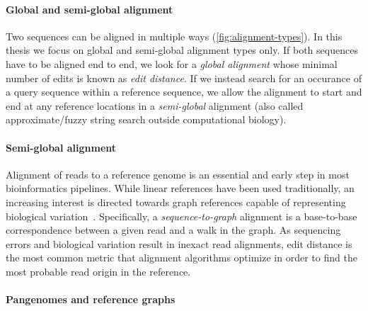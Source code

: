 \paragraph{Global and semi-global alignment}
Two sequences can be aligned in multiple ways (\cref{fig:alignment-types}). In
this thesis we focus on global and semi-global alignment types only. If both
sequences have to be aligned end to end, we look for a \emph{global alignment}
whose minimal number of edits is known as \emph{edit distance}. If we instead
search for an occurance of a query sequence within a reference sequence, we
allow the alignment to start and end at any reference locations in a
\emph{semi-global} alignment (also called approximate/fuzzy string search
outside computational biology).


\paragraph{Semi-global alignment}

Alignment of reads to a reference genome is an essential and early step in most
bioinformatics pipelines. While linear references have been used traditionally,
an increasing interest is directed towards graph references capable of
representing biological variation~\citep{garrison_variation_2018}.
%
Specifically, a \emph{sequence-to-graph} alignment is a base-to-base
correspondence between a given read and a walk in the graph. As sequencing
errors and biological variation result in inexact read alignments, edit distance
is the most common metric that alignment algorithms optimize in order to find
the most probable read origin in the reference.



\paragraph{Pangenomes and reference graphs}

